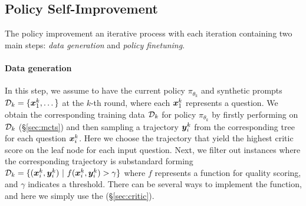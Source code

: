 \subsection{Policy Self-Improvement}
\label{sec:self_improve}

The policy improvement an iterative process with each iteration containing two main steps: \emph{data generation} and \emph{policy finetuning}.
\paragraph{Data generation} In this step, we assume to have the current policy $\pi_{\theta_k}$ and synthetic prompts ${\mathcal{D}}_k=\{{\bm{x}}^k_1,\dots\}$ at the $k$-th round, where each ${\bm{x}}^k_1$ represents a question.
We obtain the corresponding training data ${\mathcal{D}}_k$ for policy $\pi_{\theta_k}$ by firstly performing \emcts{} on ${\mathcal{D}}_k$ (\S \ref{sec:mcts}) and then sampling a trajectory ${\bm{y}}^k_i$ from the corresponding tree for each question ${\bm{x}}^k_i$.
Here we choose the trajectory that yield the highest critic score on the leaf node for each input question.
Next, we filter out instances where the corresponding trajectory is substandard forming ${\mathcal{D}}_k = \{({\bm{x}}^k_i, {\bm{y}}^k_i)~|~f({\bm{x}}^k_i, {\bm{y}}^k_i)>\gamma\}$
where $f$ represents a function for quality scoring, and $\gamma$ indicates a threshold.
There can be several ways to implement the function, and here we simply use the \orm{} (\S \ref{sec:critic}).



